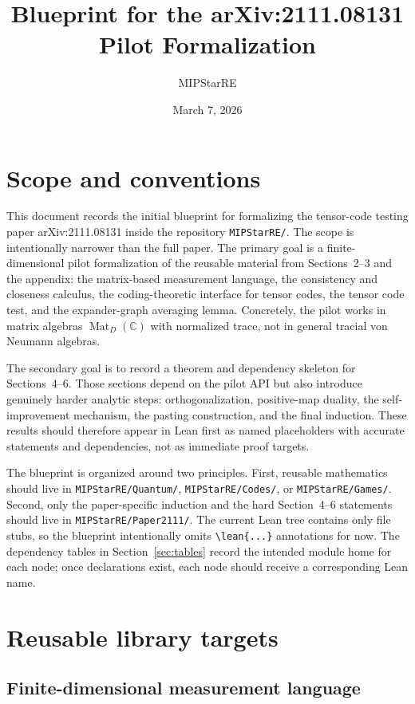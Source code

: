 \documentclass{article}
\title{Blueprint for the arXiv:2111.08131 Pilot Formalization}
\author{MIPStarRE}
\date{March 7, 2026}
\providecommand{\lean}[1]{\texttt{#1}}
\theoremstyle{remark}
\newcommand{\C}{\mathbb{C}}
\newcommand{\Mat}{\operatorname{Mat}}
\begin{document}
\maketitle
\tableofcontents

\section{Scope and conventions}

This document records the initial blueprint for formalizing the tensor-code testing paper arXiv:2111.08131 inside the repository \texttt{MIPStarRE/}. The scope is intentionally narrower than the full paper. The primary goal is a finite-dimensional pilot formalization of the reusable material from Sections~2--3 and the appendix: the matrix-based measurement language, the consistency and closeness calculus, the coding-theoretic interface for tensor codes, the tensor code test, and the expander-graph averaging lemma. Concretely, the pilot works in matrix algebras $\Mat_D(\C)$ with normalized trace, not in general tracial von Neumann algebras.

The secondary goal is to record a theorem and dependency skeleton for Sections~4--6. Those sections depend on the pilot API but also introduce genuinely harder analytic steps: orthogonalization, positive-map duality, the self-improvement mechanism, the pasting construction, and the final induction. These results should therefore appear in Lean first as named placeholders with accurate statements and dependencies, not as immediate proof targets.

The blueprint is organized around two principles. First, reusable mathematics should live in \texttt{MIPStarRE/Quantum/}, \texttt{MIPStarRE/Codes/}, or \texttt{MIPStarRE/Games/}. Second, only the paper-specific induction and the hard Section~4--6 statements should live in \texttt{MIPStarRE/Paper2111/}. The current Lean tree contains only file stubs, so the blueprint intentionally omits \verb|\lean{...}| annotations for now. The dependency tables in Section~\ref{sec:tables} record the intended module home for each node; once declarations exist, each node should receive a corresponding Lean name.

\section{Reusable library targets}

\subsection{Finite-dimensional measurement language}
\end{document}
